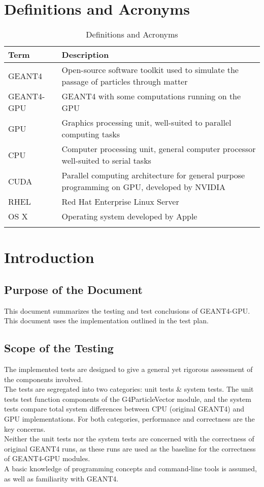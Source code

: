 \documentclass[12pt]{article}
\begin{document}
\section*{Definitions and Acronyms} %
\begin{table}[h]
\centering
\caption{Definitions and Acronyms}\label{Table_DefAndAcro}
\begin{tabularx}{\textwidth}{l|X}
\Xhline{2\arrayrulewidth}
\bf Term & \bf Description\\
\hline
GEANT4 & Open-source software toolkit used to simulate the passage of particles through matter\\\hline
GEANT4-GPU & GEANT4 with some computations running on the GPU\\\hline
GPU & Graphics processing unit, well-suited to parallel computing tasks\\\hline
CPU & Computer processing unit, general computer processor well-suited to serial tasks\\\hline
CUDA & Parallel computing architecture for general purpose programming on GPU, developed by NVIDIA\\\hline
RHEL & Red Hat Enterprise Linux Server\\\hline
OS X & Operating system developed by Apple\\
\Xhline{2\arrayrulewidth}
\end{tabularx}
\end{table}


\section{Introduction}
\subsection{Purpose of the Document}
This document summarizes the testing and test conclusions of GEANT4-GPU. This document uses the implementation outlined in the test plan.
\subsection{Scope of the Testing}
The implemented tests are designed to give a general yet rigorous assessment of the components involved.\\
The tests are segregated into two categories: unit tests \& system tests.
The unit tests test function components of the G4ParticleVector module, and the system tests compare total system differences between CPU (original GEANT4) and GPU implementations. For both categories, performance and correctness are the key concerns.\\
Neither the unit tests nor the system tests are concerned with the correctness of original GEANT4 runs, as these runs are used as the baseline for the correctness of GEANT4-GPU modules.\\
A basic knowledge of programming concepts and command-line tools is assumed, as well as familiarity with GEANT4. 
\end{document}
